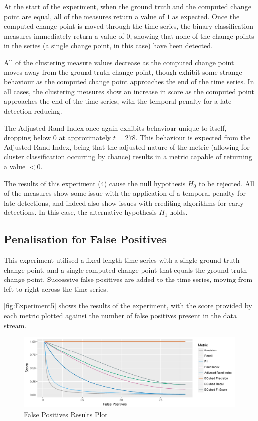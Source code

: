 \documentclass{uvamscse}	%
\begin{document}
At the start of the experiment, when the ground truth and the computed change point are equal, all of the measures return a value of $1$ as expected. Once the computed change point is moved through the time series, the binary classification measures immediately return a value of $0$, showing that none of the change points in the series (a single change point, in this case) have been detected.

All of the clustering measure values decrease as the computed change point moves away from the ground truth change point, though exhibit some strange behaviour as the computed change point approaches the end of the time series. In all cases, the clustering measures show an increase in score as the computed point approaches the end of the time series, with the temporal penalty for a late detection reducing.

The Adjusted Rand Index once again exhibits behaviour unique to itself, dropping below $0$ at approximately $t=278$. This behaviour is expected from the Adjusted Rand Index, being that the adjusted nature of the metric (allowing for cluster classification occurring by chance) results in a metric capable of returning a value $<0$.

The results of this experiment (4) cause the null hypothesis $H_0$ to be rejected. All of the measures show some issue with the application of a temporal penalty for late detections, and indeed also show issues with crediting algorithms for early detections. In this case, the alternative hypothesis $H_1$ holds.

\subsection{Penalisation for False Positives}

This experiment utilised a fixed length time series with a single ground truth change point, and a single computed change point that equals the ground truth change point. Successive false positives are added to the time series, moving from left to right across the time series.

\autoref{fig:Experiment5} shows the results of the experiment, with the score provided by each metric plotted against the number of false positives present in the data stream.

\begin{figure}[h]
    \includegraphics[width=\textwidth]{figures/Experiment5}
    \caption{False Positives Results Plot}
    \label{fig:Experiment5}
\end{figure}
\end{document}
